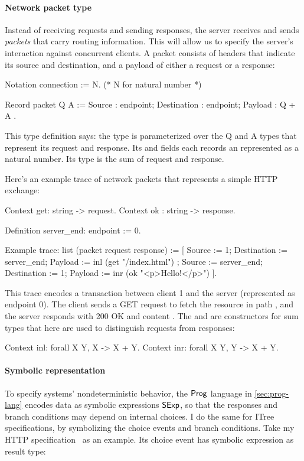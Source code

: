 \paragraph{Network packet type}
Instead of receiving requests and sending responses, the server receives and
sends {\em packets} that carry routing information.  This will allow us to
specify the server's interaction against concurrent clients.  A packet consists
of headers that indicate its source and destination, and a payload of either a
request or a response:
\begin{coq}
  Notation connection := N. (* N for natural number *)

  Record packet Q A := {
    Source      : endpoint;
    Destination : endpoint;
    Payload     : Q + A
  }.
\end{coq}
This type definition says: the  type is parameterized over the \ilc
Q and \ilc A types that represent its request and response.  Its 
and  fields each records an  represented as a
natural number.  Its  type is the sum of request and response.

Here's an example trace of network packets that represents a simple HTTP
exchange:
\begin{coq}
  Context get: string -> request.
  Context ok : string -> response.

  Definition server_end: endpoint := 0.

  Example trace: list (packet request response) :=
    [ { Source      := 1;
        Destination := server_end;
        Payload     := inl (get "/index.html")
      }
    ; { Source      := server_end;
        Destination := 1;
        Payload     := inr (ok "<p>Hello!</p>")
      }
    ].
\end{coq}
This trace encodes a transaction between client 1 and the server (represented as
endpoint 0).  The client sends a GET request to fetch the resource in path
, and the server responds with 200 OK and content
.  The  and  are constructors for sum
types that here are used to distinguish requests from responses:
\begin{coq}
  Context inl: forall {X Y}, X -> X + Y.
  Context inr: forall {X Y}, Y -> X + Y.
\end{coq}

\paragraph{Symbolic representation}
To specify systems' nondeterministic behavior, the $\mathsf{Prog}$ language in
\autoref{sec:prog-lang} encodes data as symbolic expressions $\mathsf{SExp}$, so that
the responses and branch conditions may depend on internal choices.  I do the
same for ITree specifications, by symbolizing the choice events and branch
conditions.  Take my HTTP specification~\cite{issta21} as an example.  Its
choice event has symbolic expression as result type:

